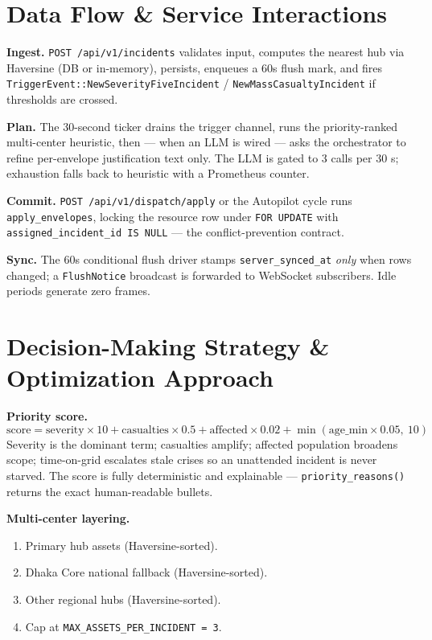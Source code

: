 \documentclass[10pt,letterpaper]{article}
\begin{document}
\section{Data Flow \& Service Interactions}
\begin{tightemize}
    \item \textbf{Ingest.} \texttt{POST /api/v1/incidents} validates input, computes the nearest hub via Haversine (DB or in-memory), persists, enqueues a 60s flush mark, and fires \texttt{TriggerEvent::NewSeverityFiveIncident} / \texttt{NewMassCasualtyIncident} if thresholds are crossed.
    \item \textbf{Plan.} The 30-second ticker drains the trigger channel, runs the priority-ranked multi-center heuristic, then --- when an LLM is wired --- asks the orchestrator to refine per-envelope justification text only. The LLM is gated to 3 calls per 30 s; exhaustion falls back to heuristic with a Prometheus counter.
    \item \textbf{Commit.} \texttt{POST /api/v1/dispatch/apply} or the Autopilot cycle runs \texttt{apply\_envelopes}, locking the resource row under \texttt{FOR UPDATE} with \texttt{assigned\_incident\_id IS NULL} --- the conflict-prevention contract.
    \item \textbf{Sync.} The 60s conditional flush driver stamps \texttt{server\_synced\_at} \emph{only} when rows changed; a \texttt{FlushNotice} broadcast is forwarded to WebSocket subscribers. Idle periods generate zero frames.
\end{tightemize}

\clearpage

\section{Decision-Making Strategy \& Optimization Approach}

\noindent\textbf{Priority score.}
\[
\text{score} = \text{severity} \times 10 + \text{casualties} \times 0.5 + \text{affected} \times 0.02 + \min(\text{age\_min} \times 0.05,\ 10)
\]
Severity is the dominant term; casualties amplify; affected population broadens scope; time-on-grid escalates stale crises so an unattended incident is never starved. The score is fully deterministic and explainable --- \texttt{priority\_reasons()} returns the exact human-readable bullets.

\noindent\textbf{Multi-center layering.}
\begin{enumerate}[leftmargin=*, topsep=2pt, itemsep=1pt, label=\textbf{\arabic*.}]
    \item Primary hub assets (Haversine-sorted).
    \item Dhaka Core national fallback (Haversine-sorted).
    \item Other regional hubs (Haversine-sorted).
    \item Cap at \texttt{MAX\_ASSETS\_PER\_INCIDENT = 3}.
\end{enumerate}
\end{document}
